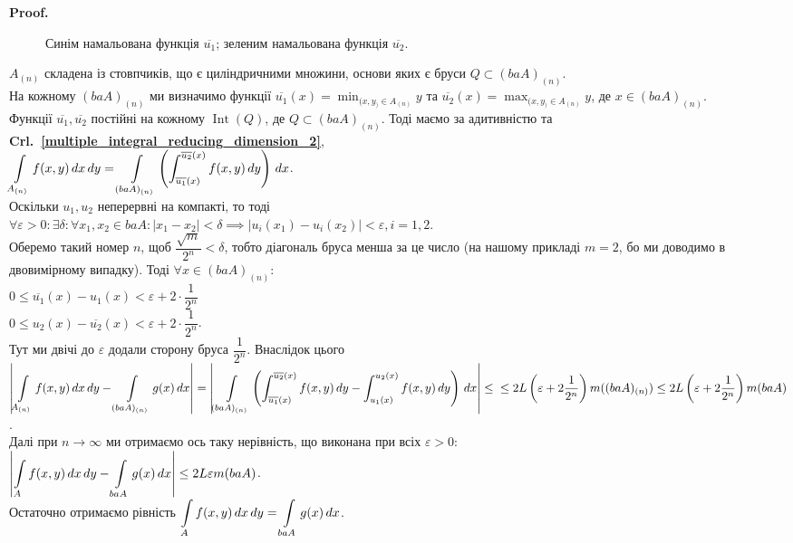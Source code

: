 \documentclass[a4paper, 10pt]{article}
\makeatletter
\def\qed{$\blacksquare$}
\theoremstyle{theoremdd}
\theoremstyle{theoremdd}
\theoremstyle{theoremdd}
\theoremstyle{theoremdd}
\theoremstyle{theoremdd}
\theoremstyle{theoremdd}
\theoremstyle{theoremdd}
\theoremstyle{theoremdd}
\theoremstyle{theoremdd}
\theoremstyle{theoremdd}
\theoremstyle{theoremdd}
\theoremstyle{theoremdd}
\theoremstyle{theoremdd}
\theoremstyle{theoremdd}
\theoremstyle{theoremdd}
\renewenvironment{proof}[1][Proof.\\]{\par
\pushQED{\hfill \qed}%
\normalfont \topsep6\p@\@plus6\p@\relax
\trivlist
\item\relax
{\bfseries
#1\@addpunct{.}}\hspace\labelsep\ignorespaces
}{%
\popQED\endtrivlist\@endpefalse
}
\DeclareMathOperator{\Int}{Int}
\newcommand\crlref[1]{\textbf{Crl.~\ref{#1}}}
\makeatother
\begin{document}
\begin{proof}
\begin{figure}[H]
\caption*{Синім намальована функція $\overline{u_1}$; зеленим намальована функція $\overline{u_2}$.}
\end{figure}
$A_{(n)}$ складена із стовпчиків, що є циліндричними множини, основи яких є бруси $Q \subset (baA)_{(n)}$.\\
На кожному $(baA)_{(n)}$ ми визначимо функції $\overline{u_1}(x) = \displaystyle\min_{(x,y_) \in A_{(n)}} y$ та $\overline{u_2}(x) = \displaystyle\max_{(x,y_) \in A_{(n)}} y$, де $x \in (baA)_{(n)}$.\\
Функції $\overline{u_1}, \overline{u_2}$ постійні на кожному $\Int(Q)$, де $Q \subset (baA)_{(n)}$. Тоді маємо за адитивністю та \crlref{multiple_integral_reducing_dimension_2},\\
$\displaystyle\int\displaylimits_{A_{(n)}} f(x,y)\,dx\,dy = \int\displaylimits_{(baA)_{(n)}} \left(\int_{\overline{u_1}(x)}^{\overline{u_2}(x)} f(x,y)\,dy \right)\,dx$.\\
Оскільки $u_1,u_2$ неперервні на компакті, то тоді\\
$\forall \varepsilon > 0: \exists \delta: \forall x_1,x_2 \in baA: |x_1-x_2| < \delta \implies |u_i(x_1)-u_i(x_2)| < \varepsilon, i =1,2$.\\
Оберемо такий номер $n$, щоб $\dfrac{\sqrt{m}}{2^n} < \delta$, тобто діагональ бруса менша за це число (на нашому прикладі $m =2$, бо ми доводимо в двовимірному випадку). Тоді $\forall x \in (baA)_{(n)}:$\\
$0 \leq \overline{u_1}(x) - u_1(x) < \varepsilon + 2 \cdot \dfrac{1}{2^n}$\\
$0 \leq u_2(x) - \overline{u_2}(x) < \varepsilon + 2 \cdot \dfrac{1}{2^n}$.\\
Тут ми двічі до $\varepsilon$ додали сторону бруса $\dfrac{1}{2^n}$. Внаслідок цього\\
$\displaystyle\abs{\int\displaylimits_{A_{(n)}} f(x,y)\,dx\,dy - \int\displaylimits_{(baA)_{(n)}} g(x)\,dx} = \abs{\int\displaylimits_{(baA)_{(n)}} \left(\int_{\overline{u_1}(x)}^{\overline{u_2}(x)} f(x,y)\,dy- \int_{u_1(x)}^{u_2(x)} f(x,y)\,dy \right)\,dx} \leq \\
\leq 2L\left(\varepsilon + 2 \dfrac{1}{2^n}\right) m((baA)_{(n)}) \leq 2L\left(\varepsilon + 2 \dfrac{1}{2^n}\right) m(baA)$.\\
Далі при $n \to \infty$ ми отримаємо ось таку нерівність, що виконана при всіх $\varepsilon > 0$:\\
$\displaystyle\left| \int\displaylimits_{A} f(x,y)\,dx\,dy - \int\displaylimits_{baA} g(x)\,dx \right| \leq 2L \varepsilon m(baA)$.\\
Остаточно отримаємо рівність $\displaystyle\int\displaylimits_A f(x,y)\,dx\,dy = \int\displaylimits_{baA} g(x)\,dx$.
\end{proof}
\end{document}
